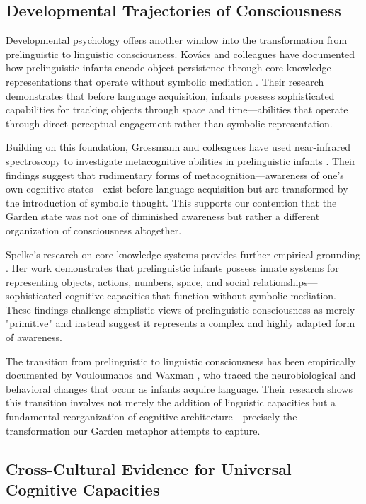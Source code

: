 \subsection{Developmental Trajectories of Consciousness}

Developmental psychology offers another window into the transformation from prelinguistic to linguistic consciousness. Kovács and colleagues have documented how prelinguistic infants encode object persistence through core knowledge representations that operate without symbolic mediation \parencite{kovacs2024prelinguistic}. Their research demonstrates that before language acquisition, infants possess sophisticated capabilities for tracking objects through space and time—abilities that operate through direct perceptual engagement rather than symbolic representation.

Building on this foundation, Grossmann and colleagues have used near-infrared spectroscopy to investigate metacognitive abilities in prelinguistic infants \parencite{grossmann2023development}. Their findings suggest that rudimentary forms of metacognition—awareness of one's own cognitive states—exist before language acquisition but are transformed by the introduction of symbolic thought. This supports our contention that the Garden state was not one of diminished awareness but rather a different organization of consciousness altogether.

Spelke's research on core knowledge systems provides further empirical grounding \parencite{spelke2024core}. Her work demonstrates that prelinguistic infants possess innate systems for representing objects, actions, numbers, space, and social relationships—sophisticated cognitive capacities that function without symbolic mediation. These findings challenge simplistic views of prelinguistic consciousness as merely "primitive" and instead suggest it represents a complex and highly adapted form of awareness.

The transition from prelinguistic to linguistic consciousness has been empirically documented by Vouloumanos and Waxman \parencite{vouloumanos2022language}, who traced the neurobiological and behavioral changes that occur as infants acquire language. Their research shows this transition involves not merely the addition of linguistic capacities but a fundamental reorganization of cognitive architecture—precisely the transformation our Garden metaphor attempts to capture.

\subsection{Cross-Cultural Evidence for Universal Cognitive Capacities}

